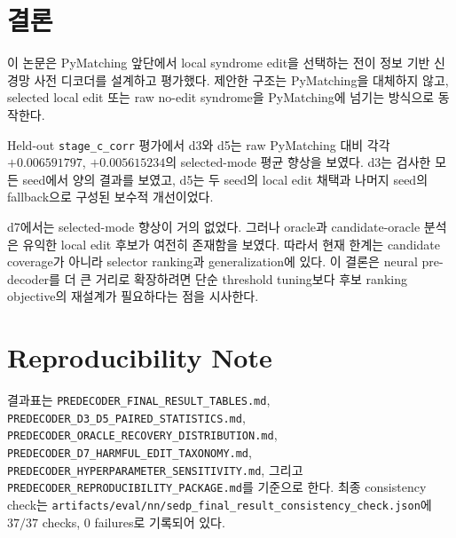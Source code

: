 \documentclass[aps,prd,12pt,twocolumn,superscriptaddress,showkeys,floatfix]{revtex4-2}
\begin{document}
\section{결론}

이 논문은 PyMatching 앞단에서 local syndrome edit을 선택하는 전이 정보 기반
신경망 사전 디코더를 설계하고 평가했다. 제안한 구조는 PyMatching을 대체하지
않고, selected local edit 또는 raw no-edit syndrome을 PyMatching에 넘기는
방식으로 동작한다.

Held-out \texttt{stage\_c\_corr} 평가에서 d3와 d5는 raw PyMatching 대비 각각
\(+0.006591797\), \(+0.005615234\)의 selected-mode 평균 향상을 보였다. d3는
검사한 모든 seed에서 양의 결과를 보였고, d5는 두 seed의 local edit 채택과
나머지 seed의 fallback으로 구성된 보수적 개선이었다.

d7에서는 selected-mode 향상이 거의 없었다. 그러나 oracle과 candidate-oracle
분석은 유익한 local edit 후보가 여전히 존재함을 보였다. 따라서 현재 한계는
candidate coverage가 아니라 selector ranking과 generalization에 있다. 이
결론은 neural pre-decoder를 더 큰 거리로 확장하려면 단순 threshold tuning보다
후보 ranking objective의 재설계가 필요하다는 점을 시사한다.

\section*{Reproducibility Note}

결과표는 \texttt{PREDECODER\_FINAL\_RESULT\_TABLES.md},
\texttt{PREDECODER\_D3\_D5\_PAIRED\_STATISTICS.md},
\texttt{PREDECODER\_ORACLE\_RECOVERY\_DISTRIBUTION.md},
\texttt{PREDECODER\_D7\_HARMFUL\_EDIT\_TAXONOMY.md},
\texttt{PREDECODER\_HYPERPARAMETER\_SENSITIVITY.md}, 그리고
\texttt{PREDECODER\_REPRODUCIBILITY\_PACKAGE.md}를 기준으로 한다. 최종
consistency check는
\texttt{artifacts/eval/nn/sedp\_final\_result\_consistency\_check.json}에
\(37/37\) checks, \(0\) failures로 기록되어 있다.



\end{document}
